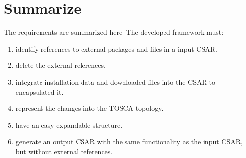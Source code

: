 \section*{Summarize}
The requirements are summarized here. 
The developed framework must:
\begin{enumerate}
	\item identify references to external packages and files in a input CSAR.\label{req:identify}
	\item delete the external references.\label{req:delete}
	\item integrate installation data and downloaded files into the CSAR to encapsulated it.\label{req:adddata}
	\item represent the changes into the TOSCA topology.\label{req:represent}
	\item have an easy expandable structure.\label{req:expand}
	\item generate an output CSAR with the same functionality as the input CSAR, but without external references.\label{req:out}
\end{enumerate}
